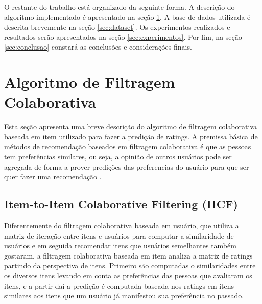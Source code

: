\documentclass[12pt, a4paper, oneside]{article}
\begin{document}

O restante do trabalho está organizado da seguinte forma. A descrição do algoritmo implementado é apresentado na seç\~ao \ref{sec:algoritmo}. A base de dados utilizada é descrita brevemente na seç\~ao \ref{sec:dataset}. Os experimentos realizados e resultados serão apresentados na seção \ref{sec:experimentos}. Por fim, na seç\~ao \ref{sec:conclusao} constar\'a as conclus\~oes e consideraç\~oes finais.



\section{Algoritmo de Filtragem Colaborativa}
\label{sec:algoritmo}

Esta seção apresenta uma breve descrição do algoritmo de filtragem colaborativa
baseada em item utilizado para fazer a predição de ratings.
A premissa básica de métodos de recomendação baseados em filtragem colaborativa é 
que as pessoas tem preferências similares, ou seja, a opinião de outros usuários pode ser
agregada de forma a prover predições das preferencias do usuário para que ser quer
fazer uma recomendação \cite{ekstrand2011collaborative}.



\subsection{Item-to-Item Colaborative Filtering (IICF)}
\label{sec:item-to-item}

Diferentemente do filtragem colaborativa baseada em usuário, que utiliza a matriz de 
iteração entre itens e usuários para computar a similaridade de usuários e em seguida
recomendar itens que usuários semelhantes também gostaram, a filtragem colaborativa 
baseada em item analiza a matriz de ratings partindo da perspectiva de itens. Primeiro
são computadas o similaridades entre os diversos itens levando em conta as preferências
das pessoas que avaliaram os itens, e a partir daí a predição é computada baseada nos
ratings em itens similares aos itens que um usuário já manifestou sua preferência no passado.
\end{document}
